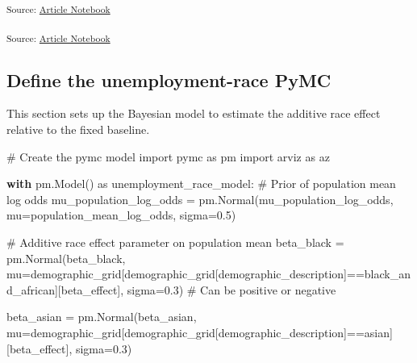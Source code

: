 \documentclass[
]{agujournal2019}
\newenvironment{Shaded}{\begin{snugshade}}{\end{snugshade}}
\newcommand{\CommentTok}[1]{\textcolor[rgb]{0.37,0.37,0.37}{#1}}
\newcommand{\ControlFlowTok}[1]{\textcolor[rgb]{0.00,0.23,0.31}{\textbf{#1}}}
\newcommand{\FloatTok}[1]{\textcolor[rgb]{0.68,0.00,0.00}{#1}}
\newcommand{\ImportTok}[1]{\textcolor[rgb]{0.00,0.46,0.62}{#1}}
\newcommand{\NormalTok}[1]{\textcolor[rgb]{0.00,0.23,0.31}{#1}}
\newcommand{\OperatorTok}[1]{\textcolor[rgb]{0.37,0.37,0.37}{#1}}
\newcommand{\StringTok}[1]{\textcolor[rgb]{0.13,0.47,0.30}{#1}}
\begin{document}
\textsubscript{Source:
\href{https://mw1296.github.io/dsan5650_social_causal_inference/index.qmd.html}{Article
Notebook}}

\textsubscript{Source:
\href{https://mw1296.github.io/dsan5650_social_causal_inference/index.qmd.html}{Article
Notebook}}

\subsection{Define the unemployment-race
PyMC}\label{define-the-unemployment-race-pymc}

This section sets up the Bayesian model to estimate the additive race
effect relative to the fixed baseline.

\begin{Shaded}
\begin{Highlighting}[]

\CommentTok{\# Create the pymc model}
\ImportTok{import}\NormalTok{ pymc }\ImportTok{as}\NormalTok{ pm}
\ImportTok{import}\NormalTok{ arviz }\ImportTok{as}\NormalTok{ az}

\ControlFlowTok{with}\NormalTok{ pm.Model() }\ImportTok{as}\NormalTok{ unemployment\_race\_model:}
    \CommentTok{\# Prior of population mean log odds}
\NormalTok{    mu\_population\_log\_odds }\OperatorTok{=}\NormalTok{ pm.Normal(}\StringTok{\textquotesingle{}mu\_population\_log\_odds\textquotesingle{}}\NormalTok{, mu}\OperatorTok{=}\NormalTok{population\_mean\_log\_odds, sigma}\OperatorTok{=}\FloatTok{0.5}\NormalTok{)}
    
    \CommentTok{\# Additive race effect parameter on population mean}
\NormalTok{    beta\_black }\OperatorTok{=}\NormalTok{ pm.Normal(}\StringTok{\textquotesingle{}beta\_black\textquotesingle{}}\NormalTok{, mu}\OperatorTok{=}\NormalTok{demographic\_grid[demographic\_grid[}\StringTok{\textquotesingle{}demographic\_description\textquotesingle{}}\NormalTok{]}\OperatorTok{==}\StringTok{\textquotesingle{}black\_and\_african\textquotesingle{}}\NormalTok{][}\StringTok{\textquotesingle{}beta\_effect\textquotesingle{}}\NormalTok{], sigma}\OperatorTok{=}\FloatTok{0.3}\NormalTok{) }\CommentTok{\# Can be positive or negative}

\NormalTok{    beta\_asian }\OperatorTok{=}\NormalTok{ pm.Normal(}\StringTok{\textquotesingle{}beta\_asian\textquotesingle{}}\NormalTok{, mu}\OperatorTok{=}\NormalTok{demographic\_grid[demographic\_grid[}\StringTok{\textquotesingle{}demographic\_description\textquotesingle{}}\NormalTok{]}\OperatorTok{==}\StringTok{\textquotesingle{}asian\textquotesingle{}}\NormalTok{][}\StringTok{\textquotesingle{}beta\_effect\textquotesingle{}}\NormalTok{], sigma}\OperatorTok{=}\FloatTok{0.3}\NormalTok{) }


\end{Highlighting}
\end{Shaded}
\end{document}
